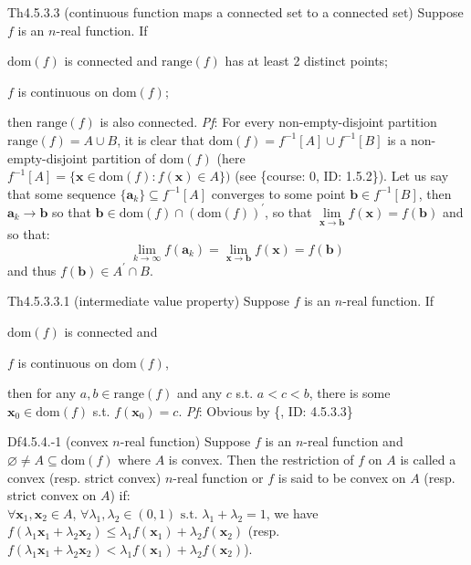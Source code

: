 \documentclass{article}
\begin{document}
\begin{Th}{Th4.5.3.3 (continuous function maps a connected set to a connected set)}
    Suppose $f$ is an $n$-real function. If
    \begin{compactenum}
        \item $\text{dom}(f)$ is connected and $\text{range}(f)$ has at least 2 distinct points;
        \item $f$ is continuous on $\text{dom}(f)$;
    \end{compactenum}
    then $\text{range}(f)$ is also connected.
    \tcblower
    \textit{Pf}: For every non-empty-disjoint partition $\text{range}(f) = A\cup B$, it is clear that $\text{dom}(f) = f^{-1}[A]\cup f^{-1}[B]$ is a non-empty-disjoint partition of $\text{dom}(f)$ (here $f^{-1}[A] = \{\pmb{x}\in\text{dom}(f): f(\pmb{x})\in A\})$ (see \{course: 0, ID: 1.5.2\}). Let us say that some sequence $\{\pmb{a}_k\}\subseteq f^{-1}[A]$ converges to some point $\pmb{b}\in f^{-1}[B]$, then $\pmb{a}_k\rightarrow\pmb{b}$ so that $\pmb{b}\in\text{dom}(f)\cap(\text{dom}(f))^\prime$, so that $\lim\limits_{\pmb{x}\to\pmb{b}} f(\pmb{x}) = f(\pmb{b})$ and so that:
    $$ \lim\limits_{k\to\infty} f(\pmb{a}_k) = \lim\limits_{\pmb{x}\to\pmb{b}} f(\pmb{x}) = f(\pmb{b})$$
    and thus $f(\pmb{b})\in A^\prime\cap B$.
\end{Th}

\begin{Th}{Th4.5.3.3.1 (intermediate value property)}
    Suppose $f$ is an $n$-real function. If
    \begin{compactenum}
        \item $\text{dom}(f)$ is connected and
        \item $f$ is continuous on $\text{dom}(f)$,
    \end{compactenum}
    then for any $a, b\in\text{range}(f)$ and any $c$ s.t. $a<c<b$, there is some $\pmb{x}_0\in\text{dom}(f)$ s.t. $f(\pmb{x}_0) = c$.
    \tcblower
    \textit{Pf}: Obvious by \{, ID: 4.5.3.3\}
\end{Th}

\begin{Df}{Df4.5.4.-1 (convex $n$-real function)}
    Suppose $f$ is an $n$-real function and $\varnothing\neq A\subseteq\text{dom}(f)$ where $A$ is convex. Then the restriction of $f$ on $A$ is called a convex (resp. strict convex) $n$-real function or $f$ is said to be convex on $A$ (resp. strict convex on $A$) if: \\
    $\forall \pmb{x}_1, \pmb{x}_2\in A$, $\forall \lambda_1, \lambda_2\in (0,1) \text{ s.t. } \lambda_1+\lambda_2=1$, we have $f(\lambda_1 \pmb{x}_1 + \lambda_2 \pmb{x}_2) \leq \lambda_1 f(\pmb{x}_1) + \lambda_2 f(\pmb{x}_2)$ (resp. $f(\lambda_1 \pmb{x}_1 + \lambda_2 \pmb{x}_2) < \lambda_1 f(\pmb{x}_1) + \lambda_2 f(\pmb{x}_2)$).
\end{Df}
\end{document}
